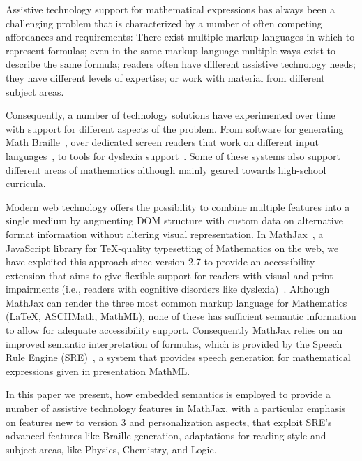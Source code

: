 \documentclass{sig-alternate}
\begin{document}
Assistive technology support for mathematical expressions has always been a
challenging problem that is characterized by a number of often competing
affordances and requirements: There exist multiple markup languages in which to
represent formulas; even in the same markup language multiple ways exist to
describe the same formula; readers often have different assistive technology
needs; they have different levels of expertise; or work with material from
different subject areas.

Consequently, a number of technology solutions have experimented over time with
support for different aspects of the problem. From software for generating Math
Braille~\cite{maddox2007mathematical}, over dedicated screen readers that work
on different input languages~\cite{raman1994aster,soiffer2005mathplayer}, to
tools for dyslexia support~\cite{equatio}. Some of these systems also support
different areas of mathematics although mainly geared towards high-school
curricula.

Modern web technology offers the possibility to combine multiple features into a
single medium by augmenting DOM structure with custom data on alternative format
information without altering visual representation. In
MathJax~\cite{MathJax2.7}, a JavaScript library for TeX-quality typesetting of
Mathematics on the web, we have exploited this approach since version 2.7 to
provide an accessibility extension that aims to give flexible support for
readers with visual and print impairments (i.e., readers with cognitive
disorders like dyslexia)~\cite{cervone2016towards}.  Although MathJax can render
the three most common markup language for Mathematics ({\LaTeX}, ASCIIMath,
MathML), none of these has sufficient semantic information to allow for adequate
accessibility support. Consequently MathJax relies on an improved semantic
interpretation of formulas, which is provided by the Speech Rule Engine
(SRE)~\cite{SRE}, a system that provides speech generation for mathematical
expressions given in presentation MathML.

In this paper we present, how embedded semantics is employed to provide a number
of assistive technology features in MathJax, with a particular emphasis on
features new to version 3 and personalization aspects, that exploit SRE's
advanced features like Braille generation, adaptations for reading style and
subject areas, like Physics, Chemistry, and Logic.


\end{document}
